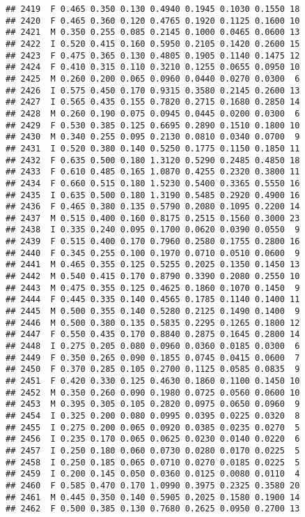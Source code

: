 \documentclass[
]{article}
\begin{document}
\begin{verbatim}
## 2419  F 0.465 0.350 0.130 0.4940 0.1945 0.1030 0.1550 18
## 2420  F 0.465 0.360 0.120 0.4765 0.1920 0.1125 0.1600 10
## 2421  M 0.350 0.255 0.085 0.2145 0.1000 0.0465 0.0600 13
## 2422  I 0.520 0.415 0.160 0.5950 0.2105 0.1420 0.2600 15
## 2423  F 0.475 0.365 0.130 0.4805 0.1905 0.1140 0.1475 12
## 2424  F 0.410 0.315 0.110 0.3210 0.1255 0.0655 0.0950 10
## 2425  M 0.260 0.200 0.065 0.0960 0.0440 0.0270 0.0300  6
## 2426  I 0.575 0.450 0.170 0.9315 0.3580 0.2145 0.2600 13
## 2427  I 0.565 0.435 0.155 0.7820 0.2715 0.1680 0.2850 14
## 2428  M 0.260 0.190 0.075 0.0945 0.0445 0.0200 0.0300  6
## 2429  F 0.530 0.385 0.125 0.6695 0.2890 0.1510 0.1800 10
## 2430  M 0.340 0.255 0.095 0.2130 0.0810 0.0340 0.0700  9
## 2431  I 0.520 0.380 0.140 0.5250 0.1775 0.1150 0.1850 11
## 2432  F 0.635 0.500 0.180 1.3120 0.5290 0.2485 0.4850 18
## 2433  F 0.610 0.485 0.165 1.0870 0.4255 0.2320 0.3800 11
## 2434  F 0.660 0.515 0.180 1.5230 0.5400 0.3365 0.5550 16
## 2435  I 0.635 0.500 0.180 1.3190 0.5485 0.2920 0.4900 16
## 2436  F 0.465 0.380 0.135 0.5790 0.2080 0.1095 0.2200 14
## 2437  M 0.515 0.400 0.160 0.8175 0.2515 0.1560 0.3000 23
## 2438  I 0.335 0.240 0.095 0.1700 0.0620 0.0390 0.0550  9
## 2439  F 0.515 0.400 0.170 0.7960 0.2580 0.1755 0.2800 16
## 2440  F 0.345 0.255 0.100 0.1970 0.0710 0.0510 0.0600  9
## 2441  M 0.465 0.355 0.125 0.5255 0.2025 0.1350 0.1450 13
## 2442  M 0.540 0.415 0.170 0.8790 0.3390 0.2080 0.2550 10
## 2443  M 0.475 0.355 0.125 0.4625 0.1860 0.1070 0.1450  9
## 2444  F 0.445 0.335 0.140 0.4565 0.1785 0.1140 0.1400 11
## 2445  M 0.500 0.355 0.140 0.5280 0.2125 0.1490 0.1400  9
## 2446  M 0.500 0.380 0.135 0.5835 0.2295 0.1265 0.1800 12
## 2447  F 0.550 0.435 0.170 0.8840 0.2875 0.1645 0.2800 14
## 2448  I 0.275 0.205 0.080 0.0960 0.0360 0.0185 0.0300  6
## 2449  F 0.350 0.265 0.090 0.1855 0.0745 0.0415 0.0600  7
## 2450  F 0.370 0.285 0.105 0.2700 0.1125 0.0585 0.0835  9
## 2451  F 0.420 0.330 0.125 0.4630 0.1860 0.1100 0.1450 10
## 2452  M 0.350 0.260 0.090 0.1980 0.0725 0.0560 0.0600 10
## 2453  M 0.395 0.305 0.105 0.2820 0.0975 0.0650 0.0960  9
## 2454  I 0.325 0.200 0.080 0.0995 0.0395 0.0225 0.0320  8
## 2455  I 0.275 0.200 0.065 0.0920 0.0385 0.0235 0.0270  5
## 2456  I 0.235 0.170 0.065 0.0625 0.0230 0.0140 0.0220  6
## 2457  I 0.250 0.180 0.060 0.0730 0.0280 0.0170 0.0225  5
## 2458  I 0.250 0.185 0.065 0.0710 0.0270 0.0185 0.0225  5
## 2459  I 0.200 0.145 0.050 0.0360 0.0125 0.0080 0.0110  4
## 2460  F 0.585 0.470 0.170 1.0990 0.3975 0.2325 0.3580 20
## 2461  M 0.445 0.350 0.140 0.5905 0.2025 0.1580 0.1900 14
## 2462  F 0.500 0.385 0.130 0.7680 0.2625 0.0950 0.2700 13

\end{verbatim}
\end{document}
